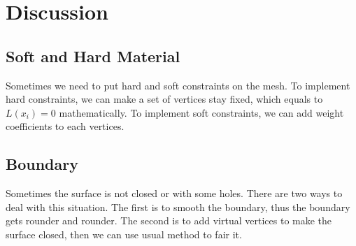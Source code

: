 \documentclass[tog]{acmsiggraph}
\begin{document}
\section{Discussion}

	\subsection{Soft and Hard Material}
Sometimes we need to put hard and soft constraints on the mesh. To implement hard constraints, we can make a set of vertices stay fixed, which equals to $L(x_i)=0$ mathematically. To implement soft constraints, we can add weight coefficients to each vertices.

\subsection{Boundary}

Sometimes the surface is not closed or with some holes. There are two ways to deal with this situation. The first is to smooth the boundary, thus the boundary gets rounder and rounder. The second is to add virtual vertices to make the surface closed, then we can use usual method to fair it.



\nocite{*}

\end{document}
